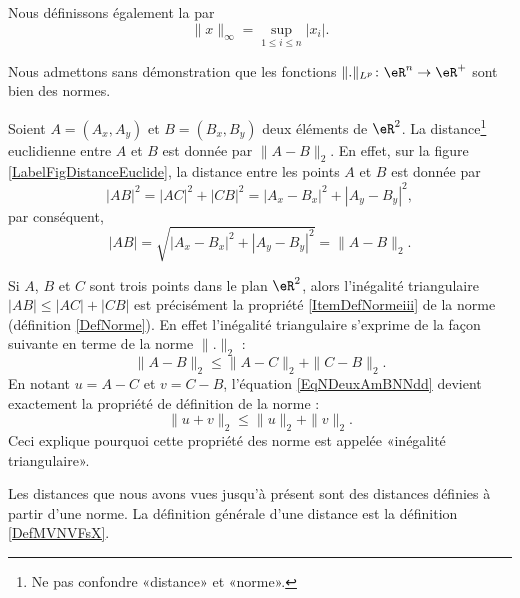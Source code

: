 \begin{definition}
    
Nous définissons également la  par
\begin{equation}
	\| x \|_{\infty}=\sup_{1\leq i\leq n}| x_i |.
\end{equation}
\end{definition}
Nous admettons sans démonstration que les fonctions $\| . \|_{L^p}\colon \eR^n\to \eR^+$ sont bien des normes.

\newcommand{\CaptionFigDistanceEuclide}{La \emph{norme} euclidienne induit la \emph{distance} euclidienne. D'où son nom. Le point $C$ est construit aux coordonnées $(A_x,B_y)$.}


Soient $A=(A_x,A_y)$ et $B=(B_x,B_y)$ deux éléments de $\eR^2$. La distance\footnote{Ne pas confondre «distance» et «norme».} euclidienne entre $A$ et $B$ est donnée par $\| A-B \|_2$. En effet, sur la figure \ref{LabelFigDistanceEuclide}, la distance entre les points $A$ et $B$ est donnée par
\begin{equation}
	| AB |^2=| AC |^2+| CB |^2=| A_x-B_x |^2+| A_y-B_y |^2,
\end{equation}
par conséquent,
\begin{equation}
	| AB |=\sqrt{| A_x-B_x |^2+| A_y-B_y |^2}=\| A-B \|_2.
\end{equation}

\begin{remark}
	Si $A$, $B$ et $C$ sont trois points dans le plan $\eR^2$, alors l'inégalité triangulaire $| AB |\leq| AC |+| CB |$ est précisément la propriété \ref{ItemDefNormeiii} de la norme (définition \ref{DefNorme}). En effet l'inégalité triangulaire s'exprime de la façon suivante en terme de la norme $\| . \|_2$ :
	\begin{equation}	\label{EqNDeuxAmBNNdd}
		\| A-B \|_2\leq \| A-C \|_2+\| C-B \|_2.
	\end{equation}
	En notant $u=A-C$ et $v=C-B$, l'équation \eqref{EqNDeuxAmBNNdd} devient exactement la propriété de définition de la norme :
	\begin{equation}
		\| u+v \|_2\leq \| u \|_2+\| v \|_2.
	\end{equation}
	Ceci explique pourquoi cette propriété des norme est appelée «inégalité triangulaire».
\end{remark}

Les distances que nous avons vues jusqu'à présent sont des distances définies à partir d'une norme. La définition générale d'une distance est la définition \ref{DefMVNVFsX}.

